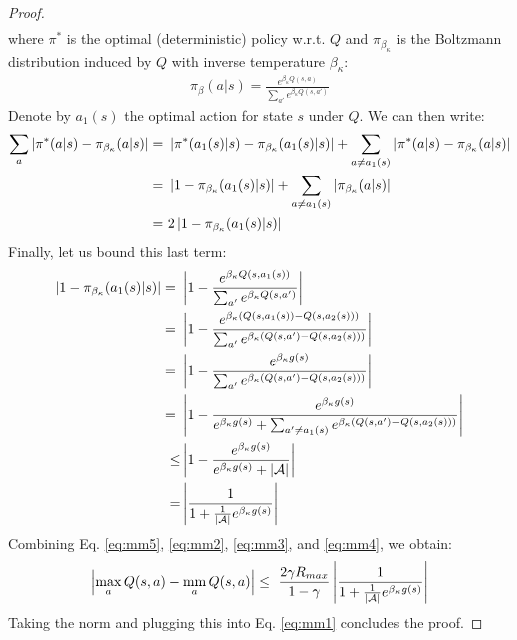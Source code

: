\documentclass{article}
\newcommand{\mm}{\operatornamewithlimits{mm}}
\newcommand{\abs}[1]{\left\lvert #1 \right\rvert}
\begin{document}
\begin{proof}
\begin{align}
\end{align}
where $\pi^*$ is the optimal (deterministic) policy w.r.t. $Q$ and $\pi_{\beta_{\kappa}}$ is the Boltzmann distribution induced by $Q$ with inverse temperature $\beta_{\kappa}$:
\begin{align*}
\pi_{\beta}(a|s) = \frac{e^{\beta_{\kappa} Q(s,a)}}{\sum_{a'}e^{\beta_{\kappa} Q(s,a')}}
\end{align*}
Denote by $a_1(s)$ the optimal action for state $s$ under $Q$. We can then write:
\begin{align} \label{eq:mm3}
\sum_a\abs{\pi^*(a|s) - \pi_{\beta_{\kappa}}(a|s)} =\ & \abs{\pi^*(a_1(s)|s) - \pi_{\beta_{\kappa}}(a_1(s)|s)} + \sum_{a \neq a_1(s)}\abs{\pi^*(a|s) - \pi_{\beta_{\kappa}}(a|s)}\notag\\ =\ & \abs{1 - \pi_{\beta_{\kappa}}(a_1(s)|s)} + \sum_{a \neq a_1(s)}\abs{\pi_{\beta_{\kappa}}(a|s)}\notag\\ =\ & 2\abs{1 - \pi_{\beta_{\kappa}}(a_1(s)|s)}
\end{align}
Finally, let us bound this last term:
\begin{align} \label{eq:mm4}
\abs{1 - \pi_{\beta_{\kappa}}(a_1(s)|s)} =\ & \abs{1 - \frac{e^{\beta_{\kappa} Q(s,a_1(s))}}{\sum_{a'}e^{\beta_{\kappa} Q(s,a')}}}\notag\\ =\ & \abs{1 - \frac{e^{\beta_{\kappa} \left( Q(s,a_1(s)) - Q(s,a_2(s)) \right)}}{\sum_{a'}e^{\beta_{\kappa} \left( Q(s,a') - Q(s,a_2(s))\right)}}}\notag\\ =\ & \abs{1 - \frac{e^{\beta_{\kappa} g(s)}}{\sum_{a'}e^{\beta_{\kappa} \left( Q(s,a') - Q(s,a_2(s))\right)}}}\notag\\ =\ & \abs{1 - \frac{e^{\beta_{\kappa} g(s)}}{e^{\beta_{\kappa} g(s)} + \sum_{a' \neq a_1(s)}e^{\beta_{\kappa} \left( Q(s,a') - Q(s,a_2(s))\right)}}}\notag\\ \leq & \abs{1 - \frac{e^{\beta_{\kappa} g(s)}}{e^{\beta_{\kappa} g(s)} + \abs{\mathcal{A}}}}\notag\\ = & \abs{\frac{1}{1 + \frac{1}{\abs{\mathcal{A}}}e^{\beta_{\kappa} g(s)}}}
\end{align}
Combining Eq. \eqref{eq:mm5}, \eqref{eq:mm2}, \eqref{eq:mm3}, and \eqref{eq:mm4}, we obtain:
\begin{align*}
\abs{\max_a Q(s,a) - \mm_a Q(s,a)} \leq\ \frac{2\gamma R_{max}}{1-\gamma}\abs{\frac{1}{1 + \frac{1}{\abs{\mathcal{A}}}e^{\beta_{\kappa} g(s)}}}
\end{align*}
Taking the norm and plugging this into Eq. \eqref{eq:mm1} concludes the proof.
\end{proof}
\end{document}
